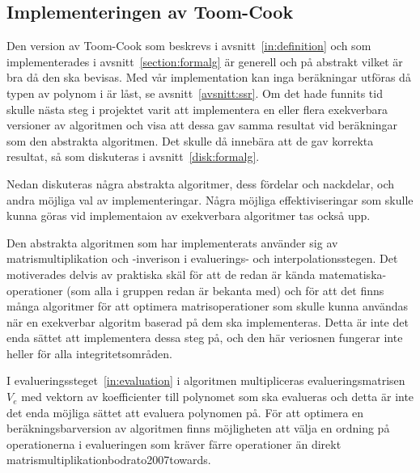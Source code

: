 \subsection{Implementeringen av Toom-Cook}
Den version av Toom-Cook som beskrevs i avsnitt~\ref{in:definition} och som
implementerades i avsnitt~\ref{section:formalg} är generell och på abstrakt
vilket är bra då den ska bevisas. Med vår implementation kan inga beräkningar
utföras då typen av polynom i \ssr är låst, se avsnitt~\ref{avsnitt:ssr}. Om
det hade funnits tid skulle nästa steg i projektet varit att implementera en
eller flera exekverbara versioner av algoritmen och visa att dessa gav samma
resultat vid beräkningar som den abstrakta algoritmen. Det skulle då innebära
att de gav korrekta resultat, så som diskuteras i avsnitt~\ref{disk:formalg}.

Nedan diskuteras några abstrakta algoritmer, dess fördelar och nackdelar, och
andra möjliga val av implementeringar. Några möjliga effektiviseringar som
skulle kunna göras vid implementaion av exekverbara algoritmer tas också upp.

Den abstrakta algoritmen som har implementerats använder sig av
matrismultiplikation och -inverison i evaluerings- och interpolationsstegen.
Det motiverades delvis av praktiska skäl för att de redan är kända
matematiska-operationer (som alla i gruppen redan är bekanta med) och för att
det finns många algoritmer för att optimera matrisoperationer som skulle kunna
användas när en exekverbar algoritm baserad på dem ska implementeras. Detta är
inte det enda sättet att implementera dessa steg på, och den här veriosnen
fungerar inte heller för alla integritetsområden.



I evalueringssteget~\ref{in:evaluation} i algoritmen multipliceras
evalueringsmatrisen $V_e$ med vektorn av koefficienter till polynomet som ska
evalueras och detta är inte det enda möjliga sättet att evaluera polynomen på.
För att optimera en beräkningsbarversion av algoritmen finns möjligheten att
välja en ordning på operationerna i evalueringen som kräver färre operationer
än direkt matrismultiplikation{bodrato2007towards}.

